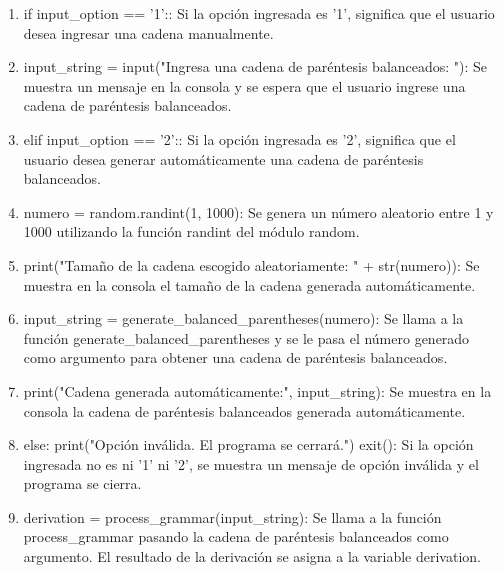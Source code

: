 \begin{enumerate}
\begin{enumerate}
    \item if input\_option == '1':: Si la opción ingresada es '1', significa que el usuario desea ingresar una cadena manualmente.\newline
    
    \item input\_string = input("Ingresa una cadena de paréntesis balanceados: "): Se muestra un mensaje en la consola y se espera que el usuario ingrese una cadena de paréntesis balanceados.\newline
    
    \item elif input\_option == '2':: Si la opción ingresada es '2', significa que el usuario desea generar automáticamente una cadena de paréntesis balanceados.\newline
    
    \item numero = random.randint(1, 1000): Se genera un número aleatorio entre 1 y 1000 utilizando la función randint del módulo random.\newline
    
    \item print("Tamaño de la cadena escogido aleatoriamente: " + str(numero)): Se muestra en la consola el tamaño de la cadena generada automáticamente.\newline
    
    \item input\_string = generate\_balanced\_parentheses(numero): Se llama a la función generate\_balanced\_parentheses y se le pasa el número generado como argumento para obtener una cadena de paréntesis balanceados.\newline
    
    \item print("Cadena generada automáticamente:", input\_string): Se muestra en la consola la cadena de paréntesis balanceados generada automáticamente.\newline
    
    \item else: print("Opción inválida. El programa se cerrará.") exit(): Si la opción ingresada no es ni '1' ni '2', se muestra un mensaje de opción inválida y el programa se cierra.\newline
    
    \item derivation = process\_grammar(input\_string): Se llama a la función process\_grammar pasando la cadena de paréntesis balanceados como argumento. El resultado de la derivación se asigna a la variable derivation.\newline
    

\end{enumerate}
\end{enumerate}
